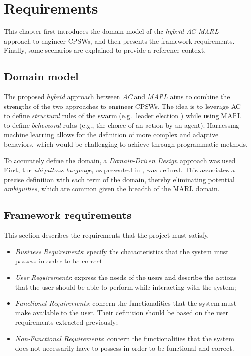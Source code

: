 \documentclass[12pt,a4paper,openright,twoside]{book}
\begin{document}
\chapter{Requirements} 
\label{chap:requirements}
This chapter first introduces the domain model of the \emph{hybrid AC-MARL} approach to engineer CPSWs, 
    and then presents the framework requirements. Finally, some scenarios
    are explained to provide a reference context.

\section{Domain model}
The proposed \emph{hybrid} approach between \emph{AC} and \emph{MARL} aims to combine the strengths of the two 
    approaches to engineer CPSWs.
    The idea is to leverage AC to define \emph{structural} rules of the swarm (e.g., leader election \cite{pianini2022self}) 
    while using MARL to define \emph{behavioral} rules (e.g., the choice of an action by an agent).
    Harnessing machine learning allows for the definition of more complex and adaptive behaviors, 
    which would be challenging to achieve through programmatic methods.

To accurately define the domain, a \emph{Domain-Driven Design} \cite{evans2004domain} approach was used. 
    First, the \emph{ubiquitous language}, as presented in , was defined. 
    This associates a precise definition with each term of the domain, thereby 
    eliminating potential \emph{ambiguities}, which are common given the breadth of the MARL domain.



\section{Framework requirements}
This section describes the requirements that the project must satisfy. 
\begin{itemize}
    \item \emph{Business Requirements}: specify the characteristics that the system must possess in order to be correct;
    \item \emph{User Requirements}: express the needs of the users and describe the actions that the user should be able 
        to perform while interacting with the system;
    \item \emph{Functional Requirements}: concern the functionalities that the system must make available to the user. 
        Their definition should be based on the user requirements extracted previously;
    \item \emph{Non-Functional Requirements}: concern the functionalities that the system does not necessarily have 
        to possess in order to be functional and correct.

\end{itemize}
\end{document}
